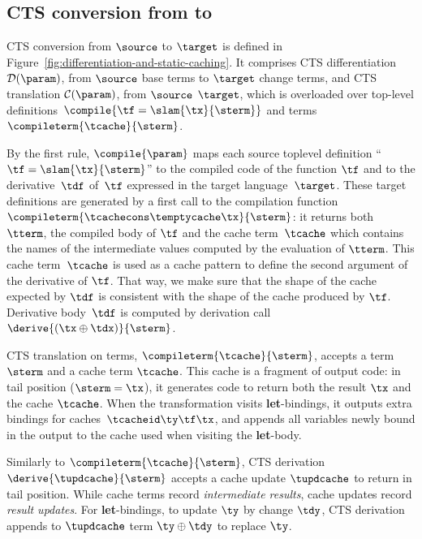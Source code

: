 \subsection{CTS conversion from \source to \target}
\label{sec:transformation}



CTS conversion from $\source$ to $\target$ is
defined in Figure~\ref{fig:differentiation-and-static-caching}. It comprises
CTS differentiation $\mathcal{D}{(\param)}$, from
$\source$ base terms to $\target$ change terms,
and CTS translation $\mathcal{C}(\param)$, from $\source$
$\target$, which is overloaded over top-level
definitions~$\compile{\tf = \slam{\tx}{\sterm}}$ and
terms~$\compileterm{\tcache}{\sterm}$.

By the first rule, $\compile{\param}$ maps each source toplevel definition
``$\tf = \slam{\tx}{\sterm}$'' to the compiled code of the
function $\tf$ and to the derivative~$\tdf$ of~$\tf$ expressed in the
target language~$\target$. These target definitions are generated by a
first call to the compilation function~$\compileterm{\tcachecons\temptycache\tx}{\sterm}$:
it returns both~$\tterm$, the compiled body of $\tf$ and the
cache term~$\tcache$ which contains the names of the intermediate
values computed by the evaluation of $\tterm$. This cache
term~$\tcache$ is used as a cache pattern to define the second
argument of the derivative of $\tf$. That way, we make sure that the
shape of the cache expected by $\tdf$ is consistent with the shape of
the cache produced by $\tf$. Derivative body~$\tdf$ is
computed by derivation call~$\derive{(\tx \oplus \tdx)}{\sterm}$.

CTS translation on terms, $\compileterm{\tcache}{\sterm}$, accepts a term
$\sterm$ and a cache term
$\tcache$. This cache is a fragment of output code: in tail
position ($\sterm = \tx$), it
generates code to return both the result $\tx$ and the cache $\tcache$. When the
transformation visits {\bf let}-bindings, it outputs extra bindings for
caches~$\tcacheid\ty\tf\tx$, and appends all variables newly bound in the output
to the cache used when visiting the {\bf let}-body.

Similarly to $\compileterm{\tcache}{\sterm}$, CTS
derivation~$\derive{\tupdcache}{\sterm}$ accepts a cache update
$\tupdcache$ to return in tail position. While cache terms record \emph{intermediate
results}, cache updates record \emph{result updates}. For {\bf let}-bindings,
to update $\ty$ by change $\tdy$, CTS derivation appends
to $\tupdcache$ term $\ty \oplus \tdy$ to replace $\ty$.

